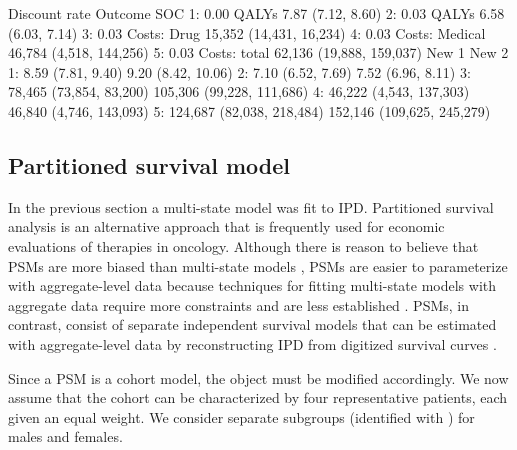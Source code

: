 \documentclass[article, nojss]{jss}\usepackage[]{graphicx}\usepackage[]{color}
\begin{document}
\begin{Schunk}
\begin{Soutput}
   Discount rate        Outcome                      SOC
1:          0.00          QALYs        7.87 (7.12, 8.60)
2:          0.03          QALYs        6.58 (6.03, 7.14)
3:          0.03    Costs: Drug  15,352 (14,431, 16,234)
4:          0.03 Costs: Medical  46,784 (4,518, 144,256)
5:          0.03   Costs: total 62,136 (19,888, 159,037)
                       New 1                      New 2
1:         8.59 (7.81, 9.40)         9.20 (8.42, 10.06)
2:         7.10 (6.52, 7.69)          7.52 (6.96, 8.11)
3:   78,465 (73,854, 83,200)  105,306 (99,228, 111,686)
4:   46,222 (4,543, 137,303)    46,840 (4,746, 143,093)
5: 124,687 (82,038, 218,484) 152,146 (109,625, 245,279)
\end{Soutput}
\end{Schunk}

\subsection{Partitioned survival model} \label{sec:psm-example}
In the previous section a multi-state model was fit to IPD. Partitioned survival analysis is an alternative approach that is frequently used for economic evaluations of therapies in oncology. Although there is reason to believe that PSMs are more biased than multi-state models \citep{woods2020partitioned}, PSMs are easier to parameterize with aggregate-level data because techniques for fitting multi-state models with aggregate data require more constraints and are less established \citep{price2011parameterization, pahuta2019technique, jansen2020multi}. PSMs, in contrast, consist of separate independent survival models that can be estimated with aggregate-level data by reconstructing IPD from digitized survival curves \citep{guyot2012enhanced}. 

Since a PSM is a cohort model, the  object must be modified accordingly. We now assume that the cohort can be characterized by four representative patients, each given an equal weight. We consider separate subgroups (identified with ) for males and females. 
\end{document}
